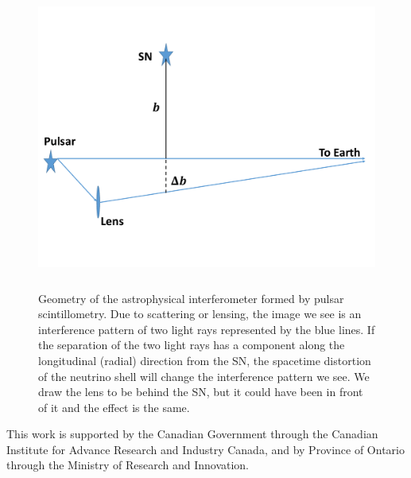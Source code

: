 \documentclass[aps,showpacs,twocolumn,floats,prd,superscriptaddress,nofootinbib]{revtex4-1}
\begin{document}
\begin{figure}[h]
\begin{center}
\includegraphics[width=\textwidth,height=10cm]{Lens.pdf}
\caption{Geometry of the astrophysical interferometer formed by pulsar scintillometry. Due to scattering or lensing, the image we see is an interference pattern of two light rays represented by the blue lines. If the separation of the two light rays has a component along the longitudinal (radial) direction from the SN, the spacetime distortion of the neutrino shell will change the interference pattern we see. We draw the lens to be behind the SN, but it could have been in front of it and the effect is the same.}
\label{fig:4}
\end{center}
\end{figure}

\twocolumngrid

\acknowledgments

This work is supported by the Canadian Government through the Canadian Institute for Advance Research and Industry Canada, and by Province of Ontario through the Ministry of Research and Innovation.

\end{document}
